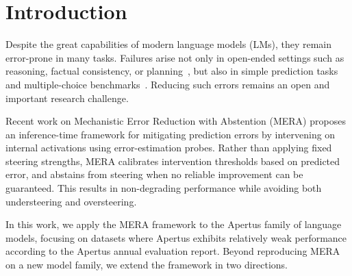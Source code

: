 \documentclass[sigconf]{acmart}
\begin{document}

\section{Introduction}
Despite the great capabilities of modern language models (LMs), they remain error-prone in many tasks. Failures arise not only in open-ended settings such as reasoning, factual consistency, or planning~\cite{kambhampati2024position}, but also in simple prediction tasks and multiple-choice benchmarks~\cite{math2021neurips, Webson2022, natureZhouSMMFH24}. Reducing such errors remains an open and important research challenge.

Recent work on Mechanistic Error Reduction with Abstention (MERA) \cite{hedstrom2025to} proposes an inference-time framework for mitigating prediction errors by intervening on internal activations using error-estimation probes. Rather than applying fixed steering strengths, MERA calibrates intervention thresholds based on predicted error, and abstains from steering when no reliable improvement can be guaranteed. This results in non-degrading performance while avoiding both understeering and oversteering.

In this work, we apply the MERA framework to the Apertus family of language models, focusing on datasets where Apertus exhibits relatively weak performance according to the Apertus annual evaluation report. Beyond reproducing MERA on a new model family, we extend the framework in two directions. 
\end{document}
